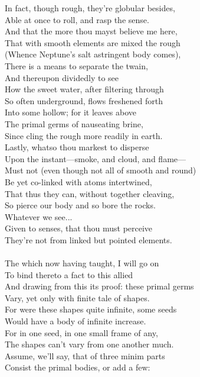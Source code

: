 In fact, though rough, they're globular besides,\\
Able at once to roll, and rasp the sense.\\
And that the more thou mayst believe me here,\\
That with smooth elements are mixed the rough\\
(Whence Neptune's salt astringent body comes),\\
There is a means to separate the twain,\\
And thereupon dividedly to see\\
How the sweet water, after filtering through\\
So often underground, flows freshened forth\\
Into some hollow; for it leaves above\\
The primal germs of nauseating brine,\\
Since cling the rough more readily in earth.\\
Lastly, whatso thou markest to disperse\\
Upon the instant—smoke, and cloud, and flame—\\
Must not (even though not all of smooth and round)\\
Be yet co-linked with atoms intertwined,\\
That thus they can, without together cleaving,\\
So pierce our body and so bore the rocks.\\
Whatever we see...\\
Given to senses, that thou must perceive\\
They're not from linked but pointed elements.\\
\\
The which now having taught, I will go on\\
To bind thereto a fact to this allied\\
And drawing from this its proof: these primal germs\\
Vary, yet only with finite tale of shapes.\\
For were these shapes quite infinite, some seeds\\
Would have a body of infinite increase.\\
For in one seed, in one small frame of any,\\
The shapes can't vary from one another much.\\
Assume, we'll say, that of three minim parts\\
Consist the primal bodies, or add a few:\\
